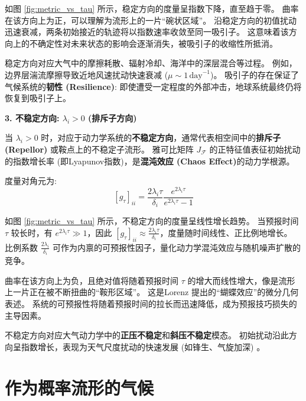 \documentclass[12pt, a4paper]{article}
\newcommand{\metric}{g}
\newcommand{\drift}{\mathcal{F}}  %
\newcommand{\jacobian}{J}         %
\newcommand{\predtime}{\tau}      %
\newcommand{\meanval}{\mu}          %
\newcommand{\eigenval}{\lambda}         %
\begin{document}
如图 \ref{fig:metric_vs_tau} 所示，稳定方向的度量呈指数下降，直至趋于零。
曲率在该方向上为正，可以理解为流形上的一片“碗状区域”。
沿稳定方向的初值扰动迅速衰减，两条初始接近的轨迹将以指数速率收敛至同一吸引子。
这意味着该方向上的不确定性对未来状态的影响会逐渐消失，被吸引子的收缩性所抵消。

稳定方向对应大气中的摩擦耗散、辐射冷却、海洋中的深层混合等过程。
例如，边界层湍流摩擦导致近地风速扰动快速衰减 ($\meanval \sim 1\,\text{day}^{-1}$)。
吸引子的存在保证了气候系统的\textbf{韧性 (Resilience)}: 即使遭受一定程度的外部冲击，地球系统最终仍将恢复到吸引子上。

\textbf{3. 不稳定方向: $\eigenval_i > 0$ (排斥子方向)}

当 $\eigenval_i > 0$ 时，对应于动力学系统的\textbf{不稳定方向}，通常代表相空间中的\textbf{排斥子 (Repellor)} 或鞍点上的不稳定子流形。
雅可比矩阵 $\jacobian_{\drift}$ 的正特征值表征初始扰动的指数增长率 (即Lyapunov指数)，是\textbf{混沌效应 (Chaos Effect)}的动力学根源。

度量对角元为:
\begin{equation}
    \label{eq:metric_tensor_diagonal_element_unstable}
    [\metric_{\predtime}]_{ii} = \frac{2 \eigenval_i \predtime}{\delta_i} \frac{e^{2 \eigenval_i \predtime}}{e^{2 \eigenval_i \predtime} - 1}
\end{equation}

如图 \ref{fig:metric_vs_tau} 所示，不稳定方向的度量呈线性增长趋势。
当预报时间 $\predtime$ 较长时，有 $e^{2\eigenval_i\predtime} \gg 1$，因此 $[\metric_{\predtime}]_{ii} \approx \frac{2\eigenval_i \predtime}{\delta_i}$，度量随时间线性、正比例地增长。
比例系数 $\frac{2\eigenval_i}{\delta_i}$ 可作为内禀的可预报性因子，量化动力学混沌效应与随机噪声扩散的竞争。

曲率在该方向上为负，且绝对值将随着预报时间 $\predtime$ 的增大而线性增大，像是流形上一片正在被不断扭曲的“鞍形区域”。
这是Lorenz \cite{lorenz1963deterministic} 提出的“蝴蝶效应”的微分几何表述。
系统的可预报性将随着预报时间的拉长而迅速降低，成为预报技巧损失的主导因素。

不稳定方向对应大气动力学中的\textbf{正压不稳定}和\textbf{斜压不稳定}模态。
初始扰动沿此方向呈指数增长，表现为天气尺度扰动的快速发展 (如锋生、气旋加深) \cite{palmer1993extended}。



\section{作为概率流形的气候}
\end{document}
